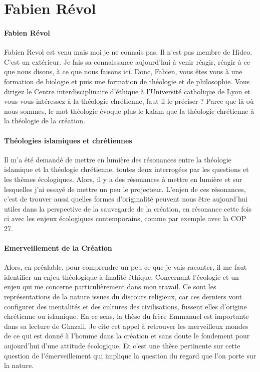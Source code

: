  
 


\section{Fabien Révol}


\paragraph{Fabien Révol}
    Fabien Revol est venu mais moi je ne connais pas. Il n'est pas membre de Hideo. C'est un extérieur. Je fais sa connaissance aujourd'hui à venir réagir, réagir à ce que nous disons, à ce que nous faisons ici. Donc, Fabien, vous êtes vous à une formation de biologie et puis une formation de théologie et de philosophie. Vous dirigez le Centre interdisciplinaire d'éthique à l'Université catholique de Lyon et vous vous intéressez à la théologie chrétienne, faut il le préciser ?
Parce que là où nous sommes, le mot théologie évoque plus le kalam que la théologie chrétienne à la théologie de la création. 

\paragraph{Théologies islamiques et chrétiennes}Il m'a été demandé de mettre en lumière des résonances entre la théologie islamique et la théologie chrétienne, toutes deux interrogées par les questions et les thèmes écologiques.
Alors, il y a des résonances à mettre en lumière et sur lesquelles j'ai essayé de mettre un peu le projecteur. L'enjeu de ces résonances, c'est de trouver aussi quelles formes d'originalité peuvent nous être aujourd'hui utiles dans la perspective de la sauvegarde de la création, en résonance cette fois ci avec les enjeux écologiques contemporains, comme par exemple avec la COP 27.

\paragraph{Emerveillement de la Création}
Alors, en préalable, pour comprendre un peu ce que je vais raconter, il me faut identifier un enjeu théologique à finalité éthique. Concernant l'écologie et un enjeu qui me concerne particulièrement dans mon travail. Ce sont les représentations de la nature issues du discours religieux, car ces derniers vont configurer des mentalités et des cultures des civilisations, fussent elles d'origine chrétienne ou islamique.
En ce sens, la thèse du frère Emmanuel est importante dans sa lecture de Ghazali. Je cite cet appel à retrouver les merveilleux mondes de ce qui est donné à l'homme dans la création et sans doute le fondement pour aujourd'hui d'une attitude écologique. Et c'est une thèse pertinente sur cette question de l'émerveillement qui implique la question du regard que l'on porte sur la nature.

